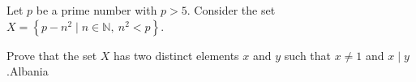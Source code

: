 Let $ p$ be a prime number with $ p>5$. Consider the set $ X = \left\{p - n^2 \mid n\in \mathbb{N} ,\ n^2 < p\right\}$.

Prove that the set $ X$ has two distinct elements $ x$ and $ y$ such that $ x\neq 1$ and $ x\mid y$.Albania